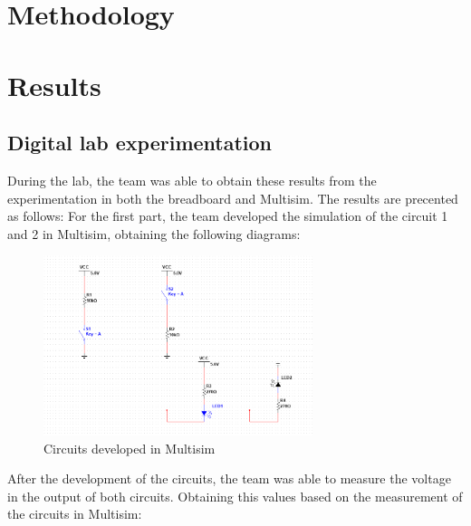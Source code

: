 \documentclass[12pt]{article}  %
\begin{document}
\section{Methodology} %

\section{Results} %
\subsection{Digital lab experimentation}
During the lab, the team was able to obtain these results from the experimentation in both the breadboard and Multisim. The results are precented as follows:
For the first part, the team developed the simulation of the circuit 1 and 2 in Multisim, obtaining the following diagrams:
\begin{figure}[H]
    \centering
    \includegraphics[width=0.7\textwidth]{Circuit 1 and 2.png}
    \caption{Circuits developed in Multisim}
    \label{fig:multisim_circuits}
\end{figure}
After the development of the circuits, the team was able to measure the voltage in the output of both circuits. Obtaining this values based on the measurement of the circuits in Multisim:
\end{document}
